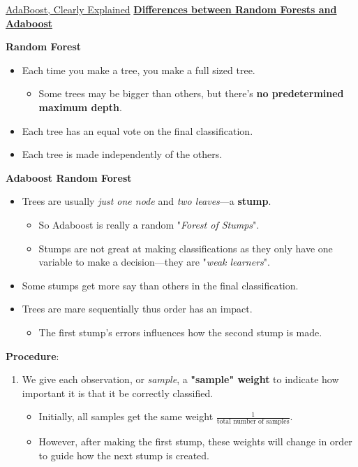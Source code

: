\documentclass[12pt, titlepage, french]{report}
\begin{document}
\begin{YTB_SUMM_AUTO_NUMB}[label = {SQ-Boo-Ada}]{\href{https://www.youtube.com/watch?v=LsK-xG1cLYA&feature=youtu.be}{AdaBoost, Clearly Explained}}
\textbf{\underline{Differences between Random Forests and Adaboost}}

\textbf{Random Forest}
\begin{itemize}[leftmargin = *]
	\item	Each time you make a tree, you make a full sized tree.
		\begin{itemize}[leftmargin = *]
		\item	Some trees may be bigger than others, but there's \textbf{no predetermined maximum depth}.
		\end{itemize}
	\item	Each tree has an equal vote on the final classification.
	\item	Each tree is made independently of the others.
\end{itemize}

\textbf{Adaboost Random Forest}
\begin{itemize}[leftmargin = *]
	\item	Trees are usually \textit{just one node} and \textit{two leaves}---a \textbf{stump}.
		\begin{itemize}[leftmargin = *]
		\item	So Adaboost is really a random "\textit{Forest of Stumps}".
		\item	Stumps are not great at making classifications as they only have one variable to make a decision---they are "\textit{weak learners}".
		\end{itemize}
	\item	Some stumps get more say than others in the final classification.
	\item	Trees are mare sequentially thus order has an impact.
		\begin{itemize}[leftmargin = *]
		\item	The first stump's errors influences how the second stump is made.
		\end{itemize}
\end{itemize}

\tcbline

\textbf{Procedure}:
\begin{enumerate}[leftmargin = *]
\item	We give each observation, or \textit{sample}, a \textbf{"sample" weight} to indicate how important it is that it be correctly classified.	
\begin{itemize}
	\item	Initially, all samples get the same weight $\frac{1}{\text{total number of samples}}$.
	\item	However, after making the first stump, these weights will change in order to guide how the next stump is created.
\end{itemize}


\end{enumerate}
\end{YTB_SUMM_AUTO_NUMB}
\end{document}
